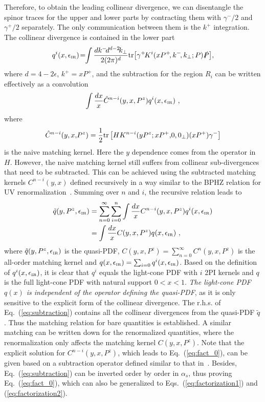 \documentclass[aps,rmp,reprint,amsmath,amssymb,graphicx,longbibliography]{revtex4-1} %
\newcommand{\nn}{\nonumber}
\DeclareRobustCommand{\eq}[1]{Eq.~(\ref{eq:#1})}
\DeclareRobustCommand{\eqs}[2]{Eqs.~(\ref{eq:#1}) and (\ref{eq:#2})}
\begin{document}
Therefore, to obtain the leading collinear divergence, we can disentangle the spinor traces for the upper and lower parts by contracting them with $\gamma^-/2$ and $\gamma^+/2$ separately. The only communication between them is the $k^+$ integration. The collinear divergence is contained in the lower part
\begin{align}
	q^{i}(x,\epsilon_{\mbox{\tiny IR}})\!=\!\!\int \frac{dk^-\!d^{d-2}\!k_\perp}{2(2\pi)^{d}}{\rm tr} \big[\gamma^+\! K^i(xP^+\!,k^-\!,k_\perp;P)\slashed{P}\big],
\end{align}
where $d=4-2\epsilon$, $k^+=xP^+$, and the subtraction for the region $R_i$ can be written effectively as a convolution
\begin{align}
	\int \frac{dx}{x} \hat C^{n-i}(y,x,P^z)q^i(x,\epsilon_{\mbox{\tiny IR}}) \ ,
\end{align}
where
\begin{align}
	\hat C^{n-i}(y,x,\!P^z)=\frac{1}{2}{\rm tr}\left[HK^{n-i}(yP^z;xP^+,\!0,0_\perp)(xP^+)\gamma^-\right]
\end{align}
is the naive matching kernel. Here the $y$ dependence comes from the operator in $H$. However, the naive matching kernel still suffers from collinear sub-divergences that need to be subtracted. This can be achieved using the subtracted matching kernels $C^{n-i}(y,x)$ defined recursively in a way similar to the BPHZ relation for UV renormalization~\cite{Collins:2011zzd}. Summing over $n$ and $i$, the recursive relation leads to
\begin{align}\label{eq:subtraction}
	\tilde q(y,P^z,\epsilon_{\mbox{\tiny IR}})&=\sum_{n=0}^{\infty}\sum_{i=0}^n \int \frac{dx}{x} C^{n-i}(y,x,P^z)q^i(x,\epsilon_{\mbox{\tiny IR}})\nn\\
	&=\int \frac{dx}{x} C(y,x,P^z)q(x,\epsilon_{\mbox{\tiny IR}}) \ ,
\end{align}
where $\tilde q(y,P^z,\epsilon_{\mbox{\tiny IR}})$ is the quasi-PDF, $C(y,x,P^z)=\sum_{n=0}^{\infty} C^{n}(y,x,P^z)$ is the all-order matching kernel and $q(x,\epsilon_{\mbox{\tiny IR}})=\sum_{i=0} q^i(x,\epsilon_{\mbox{\tiny IR}})$. Based on the definition of $q^i(x,\epsilon_{\mbox{\tiny IR}})$, it is clear that $q^i$ equals the light-cone PDF with $i$ 2PI kernels and $q$ is the full light-cone PDF with natural support $0<x<1$. {\it The light-cone PDF $q(x)$ is independent of the operator defining the quasi-PDF}, as it is only sensitive to the explicit form of the collinear divergence. The r.h.s. of \eq{subtraction} contains all the collinear divergences from the quasi-PDF $\tilde q$. Thus the matching relation for bare quantities is established. A similar matching can be written down for the renormalized quantities, where the renormalization only affects the matching kernel $C(y,x,P^z)$. Note that the explicit solution for $C^{n-i}(y,x,P^z)$, which leads to \eq{fact_0}, can be given based on a subtraction operator defined similar to that in~\cite{Collins:2011zzd}. Besides, \eq{subtraction} can be inverted order by order in $\alpha_s$, thus proving \eq{fact_0}, which can also be generalized to \eqs{factorization1}{factorization2}.
\end{document}
